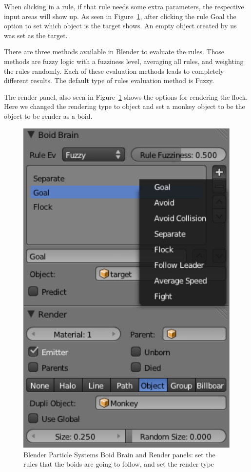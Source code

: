 When clicking in a rule, if that rule needs some extra parameters, the respective input areas will show up. As seen in Figure~\ref{boidsBrain}, after clicking the rule Goal the option to set which object is the target shows. An empty object created by us was set as the target. 

There are three methods available in Blender to evaluate the rules. Those methods are fuzzy logic with a fuzziness level, averaging all rules, and weighting the rules randomly. Each of these evaluation methods leads to completely different results. The default type of rules evaluation method is Fuzzy.

The render panel, also seen in Figure~\ref{boidsBrain} shows the options for rendering the flock. Here we changed the rendering type to object and set a monkey object to be the object to be render as a boid.

\begin{figure}[htbp]
\begin{center}
\includegraphics[scale = 0.65]{figures/boidsBrain.pdf}
\caption{Blender Particle Systems Boid Brain and Render panels: set the rules that the boids are going to follow, and set the render type}
\label{boidsBrain}
\end{center}
\end{figure}

